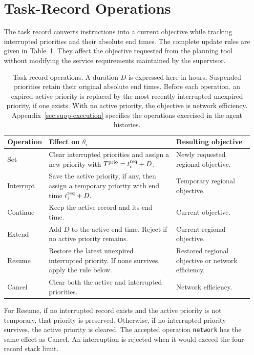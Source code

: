\documentclass[final]{cas-sc}
\theoremstyle{definition}
\theoremstyle{plain}
\theoremstyle{definition}
\theoremstyle{plain}
\newcommand{\appref}[1]{Appendix~\ref{#1}}
\begin{document}
\section{Task-Record Operations}
\label{app:task-operations}

The task record converts instructions into a current objective while
tracking interrupted priorities and their absolute end times. The complete
update rules are given in Table~\ref{tab:task-operations}. They affect the
objective requested from the planning tool without modifying the service
requirements maintained by the supervisor.

\begin{table}[pos=htbp]
\centering\small
\caption{Task-record operations. A duration $D$ is expressed here in
hours. Suspended priorities retain their original absolute end times.
Before each operation, an expired active priority is replaced by the
most recently interrupted unexpired priority, if one exists. With no
active priority, the objective is network efficiency. \appref{sec:supp-execution} specifies the operations exercised in
the agent histories.}
\label{tab:task-operations}
\begin{tabularx}{\textwidth}{@{}l>{\raggedright\arraybackslash}X>{\raggedright\arraybackslash}X@{}}
\toprule
Operation & Effect on $\theta_i$ & Resulting objective\\
\midrule
Set & Clear interrupted priorities and assign a new priority with
$T^{\rm prio}=t_i^{\rm req}+D$. & Newly requested regional objective.\\
Interrupt & Save the active priority, if any, then assign a temporary
priority with end time $t_i^{\rm req}+D$. & Temporary regional objective.\\
Continue & Keep the active record and its end time. & Current objective.\\
Extend & Add $D$ to the active end time. Reject if no active priority
remains. & Current regional objective.\\
Resume & Restore the latest unexpired interrupted priority. If none
survives, apply the rule below. & Restored regional objective or network
efficiency.\\
Cancel & Clear both the active and interrupted priorities. & Network
efficiency.\\
\bottomrule
\end{tabularx}
\par\smallskip\raggedright\footnotesize
For Resume, if no interrupted record exists and the active priority is
not temporary, that priority is preserved. Otherwise, if no interrupted
priority survives, the active priority is cleared. The accepted operation \texttt{network} has the same effect as Cancel.
An interruption is rejected when it would exceed the four-record stack
limit.
\end{table}
\end{document}
